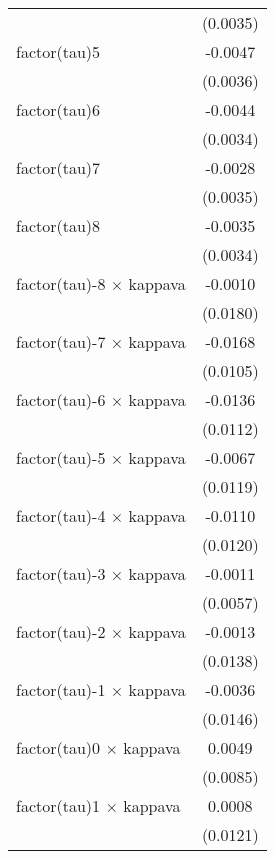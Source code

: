 \begin{tabular}{lc}
                                   & (0.0035)\\   
   factor(tau)5                    & -0.0047\\   
                                   & (0.0036)\\   
   factor(tau)6                    & -0.0044\\   
                                   & (0.0034)\\   
   factor(tau)7                    & -0.0028\\   
                                   & (0.0035)\\   
   factor(tau)8                    & -0.0035\\   
                                   & (0.0034)\\   
   factor(tau)-8 $\times$ kappava  & -0.0010\\   
                                   & (0.0180)\\   
   factor(tau)-7 $\times$ kappava  & -0.0168\\   
                                   & (0.0105)\\   
   factor(tau)-6 $\times$ kappava  & -0.0136\\   
                                   & (0.0112)\\   
   factor(tau)-5 $\times$ kappava  & -0.0067\\   
                                   & (0.0119)\\   
   factor(tau)-4 $\times$ kappava  & -0.0110\\   
                                   & (0.0120)\\   
   factor(tau)-3 $\times$ kappava  & -0.0011\\   
                                   & (0.0057)\\   
   factor(tau)-2 $\times$ kappava  & -0.0013\\   
                                   & (0.0138)\\   
   factor(tau)-1 $\times$ kappava  & -0.0036\\   
                                   & (0.0146)\\   
   factor(tau)0 $\times$ kappava   & 0.0049\\   
                                   & (0.0085)\\   
   factor(tau)1 $\times$ kappava   & 0.0008\\   
                                   & (0.0121)\\   

\end{tabular}
